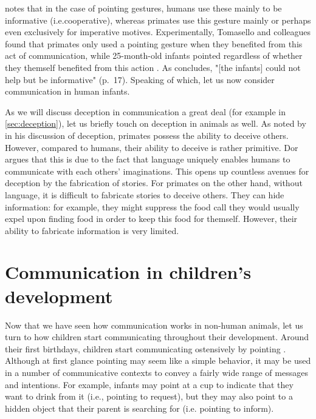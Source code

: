 \citet{Tomasello09} notes that in the case of pointing gestures, humans use these mainly to be informative (i.e.\@ cooperative), whereas primates use this gesture mainly or perhaps even exclusively for imperative motives. Experimentally, Tomasello and colleagues found that primates only used a pointing gesture when they benefited from this act of communication, while 25-month-old infants pointed regardless of whether they themself benefited from this action \citep{Bullinger11}. As \citet{Tomasello09} concludes, "[the infants] could not help but be informative" (p.~17). Speaking of which, let us now consider communication in human infants.

As we will discuss deception in communication a great deal (for example in \cref{sec:deception}), let us briefly touch on deception in animals as well. As noted by \citet{Dor17} in his discussion of deception, primates possess the ability to deceive others.
However, compared to humans, their ability to deceive is rather primitive. Dor argues that this is due to the fact that language uniquely enables humans to communicate with each others' imaginations. This opens up countless avenues for deception by the fabrication of stories. For primates on the other hand, without language, it is difficult to fabricate stories to deceive others. They can hide information: for example, they might suppress the food call they would usually expel upon finding food in order to keep this food for themself. However, their ability to fabricate information is very limited.

\section{Communication in children's development}
\label{sec:comm:ontogeny}

Now that we have seen how communication works in non-human animals, let us turn to how children start communicating throughout their development.
Around their first birthdays, children start communicating ostensively by pointing \citep{Tomasello08}.
Although at first glance pointing may seem like a simple behavior, it may be used in a number of communicative contexts to convey a fairly wide range of messages and intentions.
For example, infants may point at a cup to indicate that they want to drink from it (i.e., pointing to request), but they may also point to a hidden object that their parent is searching for (i.e. pointing to inform).

